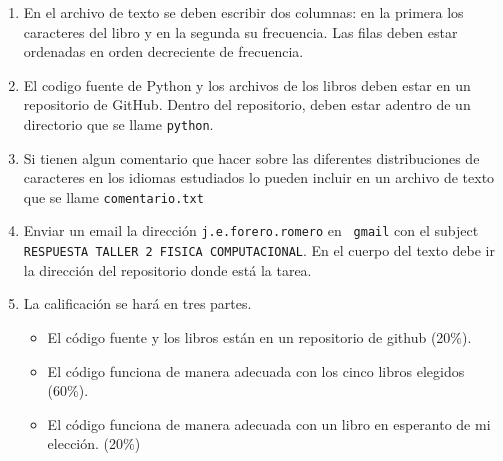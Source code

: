 \documentclass{article}
\begin{document}
\begin{enumerate}
\item
En el archivo de texto se deben escribir dos columnas: en la primera
los caracteres del libro y en la segunda su frecuencia. Las filas
deben estar ordenadas en orden decreciente de frecuencia. 

\item
El codigo fuente de Python y los archivos de los libros deben estar en
un repositorio de GitHub. Dentro del repositorio, deben estar adentro
de un directorio que se llame 
\verb"python". 

\item
Si tienen algun comentario que hacer sobre las diferentes distribuciones
de caracteres en los idiomas estudiados lo pueden incluir en un archivo de
texto que se llame \verb"comentario.txt"

\item
Enviar un email la direcci\'on {\tt j.e.forero.romero} en {\tt
  gmail} con el subject
\verb"RESPUESTA TALLER 2 FISICA COMPUTACIONAL". En el cuerpo del texto
debe ir la direcci\'on del repositorio donde est\'a la tarea. 

\item
La calificaci\'on se har\'a en tres partes.
\begin{itemize}
\item El c\'odigo fuente y los libros est\'an en un repositorio de
  github (20\%). 
\item El c\'odigo funciona de manera adecuada con los cinco libros
  elegidos (60\%). 
\item El c\'odigo funciona de manera adecuada con un libro en
  esperanto de mi elecci\'on. (20\%) 
\end{itemize}
\end{enumerate}
\end{document}
